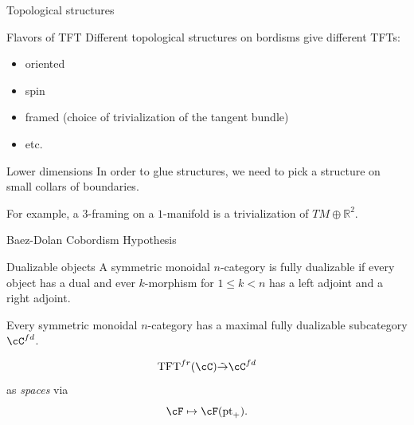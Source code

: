 \documentclass[beamer]{beamer}
\begin{document}
\begin{frame}{Topological structures}

\begin{block}{Flavors of TFT}
Different topological structures on bordisms give different TFTs:
\begin{itemize}
\item oriented
\item spin
\item framed (choice of trivialization of the tangent bundle)
\item etc.
\end{itemize}
\end{block}

\begin{block}{Lower dimensions}
In order to glue structures, we need to pick a structure on small collars of boundaries.

\vspace{.1in}
For example, a $3$-framing on a $1$-manifold is a trivialization of $TM \oplus \mathbb{R}^2$.
\end{block}

\end{frame}

\begin{frame}{Baez-Dolan Cobordism Hypothesis}

\begin{block}{Dualizable objects}
A symmetric monoidal $n$-category is fully dualizable if every object has a dual and ever $k$-morphism for $1 \leq k < n$ has a left adjoint and a right adjoint.  
\newline

Every symmetric monoidal $n$-category has a maximal fully dualizable subcategory $\cC^{fd}$.
\end{block}

\begin{theorem}
$$\mathrm{TFT}^{fr}(\cC) \tilde{\rightarrow} \cC^{fd}$$ as \emph{spaces} via $$\cF \mapsto \cF(\mathrm{pt}_+).$$
\end{theorem}
\end{frame}
\end{document}
